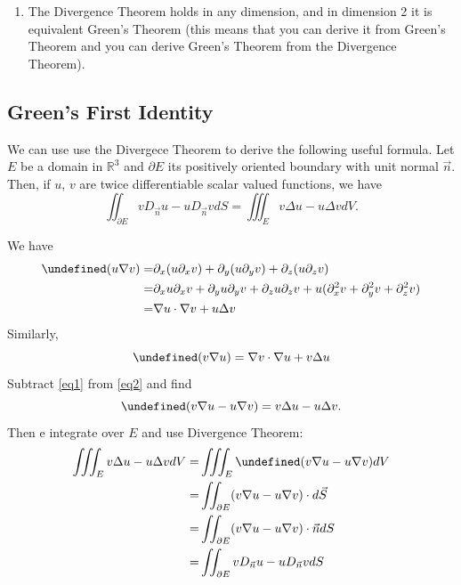 \documentclass[12pt]{article}
\newcommand{\p}{\partial}
\newcommand{\R}{ \mathbb{R}}
\newcommand{\n}{\nabla}
\newcommand{\vn}{\vec{n}}
\newcommand{\vS}{\vec{S}}
\let \div \undefined
\DeclareMathOperator{\div}{div}
\begin{document}
\begin{enumerate}
\item The Divergence Theorem holds in any dimension, and in dimension 2 it is equivalent Green's Theorem (this means that you can derive it from Green's Theorem and you can derive Green's Theorem from the Divergence Theorem).



\end{enumerate}


\subsection*{Green's First Identity}

We can use use the Divergece Theorem to derive the following useful formula. Let $E$ be a domain in $\R^3$ and $\p E$ its positively oriented boundary with unit normal $\vec{n}$. Then, if $u$, $v$ are twice differentiable scalar valued functions, we have $$\iint_{\p E} vD_{\vn}u-u D_{\vn}vdS=\iiint_Ev\Delta u-u\Delta vdV.$$

We have \begin{align}
\div(u\n v)=&\p_x(u\p_xv)+\p_y(u\p_yv)+\p_z(u\p_zv)\\
=&\p_xu\p_xv+\p_yu\p_yv+\p_zu\p_zv+u(\p^2_xv+\p^2_yv+\p^2_zv)\\
=&\nabla u\cdot\n v+u\Delta v\label{eq1}
\end{align}
Similarly, \begin{equation}
\div(v\n u)=\n v\cdot\n u+v\Delta u\label{eq2}
\end{equation}
Subtract \eqref{eq1} from \eqref{eq2} and find $$\div(v\n u-u\n v)=v\Delta u-u\Delta v.$$ Then e integrate over $E$ and use Divergence Theorem:
\begin{align*}
\iiint_E v\Delta u-u\Delta v dV=&\iiint_E \div(v\n u-u\n v)dV\\
=& \iint_{\p E} (v\n u-u\n v)\cdot d\vS\\
=& \iint_{\p E} (v\n u-u\n v)\cdot\vn dS\\
=& \iint_{\p E} vD_{\vn}u-u D_{\vn}vdS
\end{align*}
\end{document}

